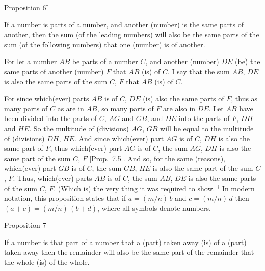 
\begin{center}
{\large Proposition 6}$^\dag$
\end{center}

If a number is parts of a number, and another
(number) is the same parts of another, then the sum (of the leading numbers)
will also be the same parts of the sum (of the following numbers) that one (number) is of another.

\epsfysize=2in
\centerline{}

For let a number $AB$ be parts of a number $C$, and another
(number) $DE$ (be)  the same parts of  another (number) $F$ that $AB$ (is) of $C$.
I say that the sum $AB$, $DE$ is also the same parts of the sum
$C$, $F$ that $AB$ (is) of $C$.

For since which(ever) parts $AB$ is of $C$, $DE$ (is) also the same parts  of $F$,
thus as many parts of $C$ as are in $AB$, so many 
 parts of $F$ are also in $DE$. Let $AB$ have been divided into the parts of
$C$, $AG$ and $GB$, and $DE$ into the parts of $F$, $DH$ and $HE$. So the
multitude of (divisions) $AG$, $GB$ will be equal to the multitude
of (divisions) $DH$, $HE$. And since which(ever) part $AG$ is of $C$, $DH$ is
also the same part of $F$, thus which(ever) part $AG$ is of $C$, the sum $AG$, $DH$
is  also the same part of the sum $C$, $F$ [Prop.~7.5].  And so, for the same (reasons), 
which(ever) part $GB$ is of $C$, the sum $GB$, $HE$ is also
the same part of the sum $C$, $F$. Thus, which(ever) parts $AB$ is of $C$, the
sum $AB$, $DE$ is also the same parts of the sum $C$, $F$. (Which is)
the very thing it was required to show.
{\footnotesize\noindent$^\dag$ In modern notation,
this proposition states that if $a = (m/n)\,b$ and $c=(m/n)\,d$
then $(a+c) = (m/n)\,(b+d)$, where all symbols denote numbers.}


\begin{center}
{\large Proposition 7}$^\dag$
\end{center}

If a number is that part of a number that a (part) taken away (is) of a (part) taken away then the remainder will also
be the same part of the remainder that the whole (is) of the whole.

\epsfysize=0.75in
\centerline{}

